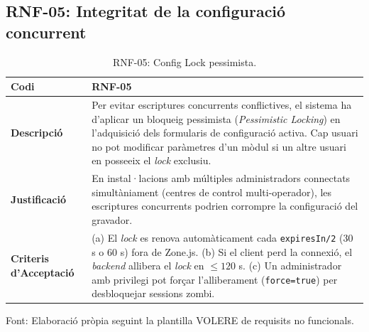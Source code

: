 \subsection{RNF-05: Integritat de la configuració concurrent}
\begin{table}[htbp]
  \centering
  \small
  \begin{tabular}{|l|p{10cm}|}
    \hline
    \textbf{Codi}                    & RNF-05 \\ \hline
    \textbf{Descripció}              & Per evitar escriptures concurrents conflictives, el sistema ha d'aplicar un bloqueig pessimista (\textit{Pessimistic Locking}) en l'adquisició dels formularis de configuració activa. Cap usuari no pot modificar paràmetres d'un mòdul si un altre usuari en posseeix el \textit{lock} exclusiu. \\ \hline
    \textbf{Justificació}            & En instal·lacions amb múltiples administradors connectats simultàniament (centres de control multi-operador), les escriptures concurrents podrien corrompre la configuració del gravador. \\ \hline
    \textbf{Criteris d'Acceptació}   & (a) El \textit{lock} es renova automàticament cada \texttt{expiresIn/2} (30 s o 60 s) fora de Zone.js. (b) Si el client perd la connexió, el \textit{backend} allibera el \textit{lock} en $\leq 120$ s. (c) Un administrador amb privilegi pot forçar l'alliberament (\texttt{force=true}) per desbloquejar sessions zombi. \\ \hline
  \end{tabular}
  \caption{RNF-05: Config Lock pessimista.}
  \label{tab:rnf05}
\par\smallskip
\small Font: Elaboració pròpia seguint la plantilla VOLERE de requisits no funcionals.
\end{table}

